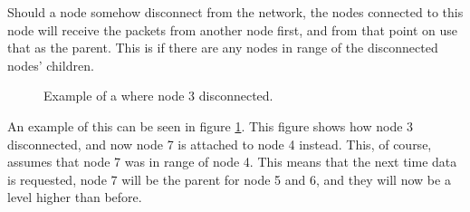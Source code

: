 Should a node somehow disconnect from the network, the nodes connected to this node will receive the packets from another node first, and from that point on use that as the parent. This is if there are any nodes in range of the disconnected nodes' children. 

\begin{figure}[!h]
	\centering
	\caption{Example of a where node 3 disconnected.}
	\label{fig:prottree2}
\end{figure}

An example of this can be seen in figure \ref{fig:prottree2}. This figure shows how node 3 disconnected, and now node 7 is attached to node 4 instead. This, of course, assumes that node 7 was in range of node 4.
This means that the next time data is requested, node 7 will be the parent for node 5 and 6, and they will now be a level higher than before.
